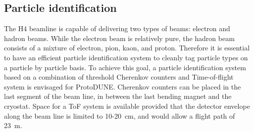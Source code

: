 \subsection{Particle identification}
The H4 beamline is capable of delivering two types of beams: electron and hadron beams. While the electron beam is relatively pure, the hadron beam consists of a mixture of electron, pion, kaon, and proton. Therefore it is essential to have an efficient particle identification system to cleanly tag particle types on a particle by particle basis. To achieve this goal, a particle identification system based on a combination of threshold Cherenkov counters and Time-of-flight system is envisaged for ProtoDUNE. 
Cherenkov counters can be placed in the last segment of the beam line, in between the last bending magnet and the cryostat. Space for a ToF system is available provided that the detector envelope along the beam line is limited to 10-20~cm,
and would allow a flight path of 23~m.

